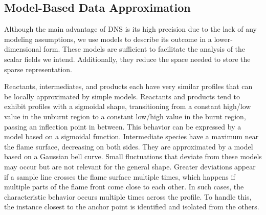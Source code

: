 \subsection{Model-Based Data Approximation} %
\label{sub:fitting}
%
Although the main advantage of \ac{DNS} is its high precision due to the lack of any
modeling assumptions, we use models to describe its outcome in a lower-
dimensional form. These models are sufficient to facilitate the analysis of the
scalar fields we intend. Additionally, they reduce the space needed to store the
sparse representation.

Reactants, intermediates, and products each have very similar profiles that can
be locally approximated by simple models. Reactants and products tend to exhibit
profiles with a sigmoidal shape, transitioning from a constant high/low value in
the unburnt region to a constant low/high value in the burnt region, passing an
inflection point in between. This behavior can be expressed by a model based on
a sigmoidal function. Intermediate species have a maximum near the flame
surface, decreasing on both sides. They are approximated by a model based on a
Gaussian bell curve. Small fluctuations that deviate from these models may occur
but are not relevant for the general shape. Greater deviations appear if a
sample line crosses the flame surface multiple times, which happens if multiple
parts of the flame front come close to each other. In such cases, the
characteristic behavior occurs multiple times across the profile. To handle
this, the instance closest to the anchor point is identified and isolated from
the others.
%
